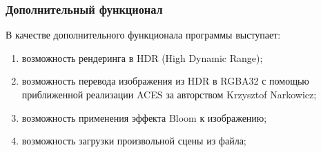 \subsubsection{Дополнительный функционал}

В качестве дополнительного функционала программы выступает:
\begin{enumerate}
    \item возможность рендеринга в HDR (High Dynamic Range);
    \item возможность перевода изображения из HDR в RGBA32 с помощью приближенной реализации ACES за авторством Krzysztof Narkowicz;
    \item возможность применения эффекта Bloom к изображению;
    \item возможность загрузки произвольной сцены из файла;
\end{enumerate}
